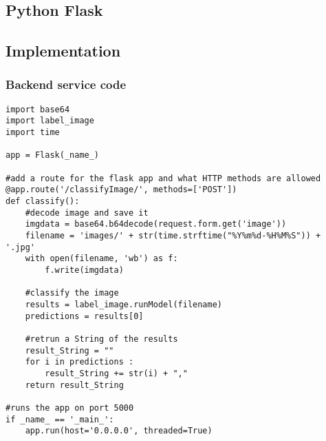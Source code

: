 \subsection*{Python Flask}

\subsection*{Implementation}
\subsubsection*{Backend service code}
\begin{lstlisting}[style=Python]
import base64
import label_image
import time

app = Flask(_name_)

#add a route for the flask app and what HTTP methods are allowed
@app.route('/classifyImage/', methods=['POST'])
def classify():
    #decode image and save it
    imgdata = base64.b64decode(request.form.get('image'))
    filename = 'images/' + str(time.strftime("%Y%m%d-%H%M%S")) + '.jpg'
    with open(filename, 'wb') as f:
        f.write(imgdata)

    #classify the image
    results = label_image.runModel(filename)
    predictions = results[0]

    #retrun a String of the results
    result_String = ""
    for i in predictions :
        result_String += str(i) + ","
    return result_String

#runs the app on port 5000
if _name_ == '_main_':
    app.run(host='0.0.0.0', threaded=True)
\end{lstlisting}

